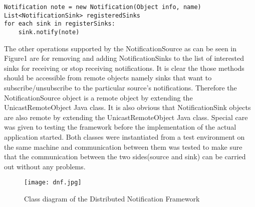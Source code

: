 \documentclass[a4paper,12pt,titlepage]{article}
\begin{document}
\begin{lstlisting}
Notification note = new Notification(Object info, name)
List<NotificationSink> registeredSinks
for each sink in registerSinks:
	sink.notify(note)
\end{lstlisting}
The other operations supported by the NotificationSource as can be seen in Figure1 are for removing and adding NotificationSinks to the list of interested sinks for receiving or stop receiving notifications. It is clear the those methods should be accessible from remote objects namely sinks that want to subscribe/unsubscribe to the particular source's notifications. Therefore the NotificationSource object is a remote object by extending the UnicastRemoteObject Java class. It is also obvious that NotificationSink objects are also remote by extending the UnicastRemoteObject Java class. Special care was given to testing the framework before the implementation of the actual application started. Both classes were instantiated from a test environment on the same machine and communication between them was tested to make sure that the communication between the two sides(source and sink) can be carried out without any problems.
\begin{figure}[h!]
  \centering
 \texttt{[image: dnf.jpg]}
\caption{Class diagram of the Distributed Notification Framework}
\end{figure}
\end{document}
